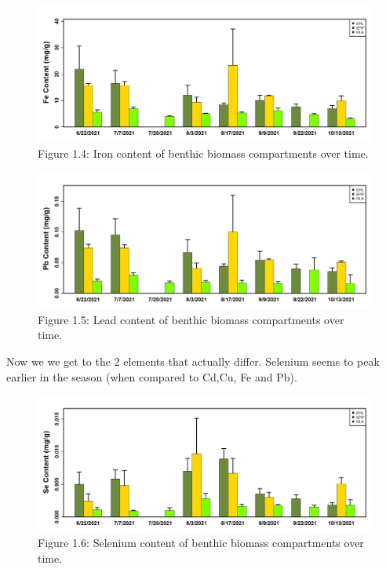 \documentclass[
]{article}
\begin{document}
\FloatBarrier

\begin{figure}
\includegraphics[width=1\linewidth]{Figures/4} \caption[Figure 1.4]{Figure 1.4: Iron content of benthic biomass compartments over time.}\label{fig:unnamed-chunk-4}
\end{figure}

\FloatBarrier

\begin{figure}
\includegraphics[width=1\linewidth]{Figures/5} \caption[Figure 1.5]{Figure 1.5: Lead content of benthic biomass compartments over time.}\label{fig:unnamed-chunk-5}
\end{figure}

\FloatBarrier

\newpage

Now we we get to the 2 elements that actually differ. Selenium seems to
peak earlier in the season (when compared to Cd,Cu, Fe and Pb).

\begin{figure}
\includegraphics[width=1\linewidth]{Figures/6} \caption[Figure 1.6]{Figure 1.6: Selenium content of benthic biomass compartments over time.}\label{fig:unnamed-chunk-6}
\end{figure}
\end{document}

